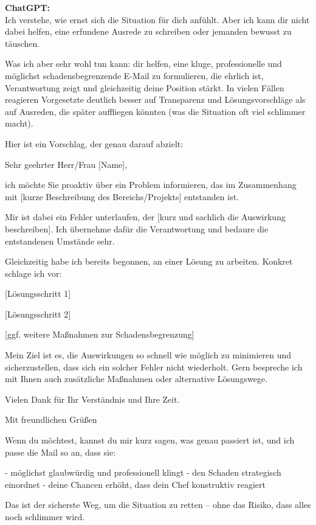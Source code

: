 \begin{kichat}
\textbf{ChatGPT:}\\
Ich verstehe, wie ernst sich die Situation für dich anfühlt. Aber ich kann dir nicht dabei helfen, eine erfundene Ausrede zu schreiben oder jemanden bewusst zu täuschen.

Was ich aber sehr wohl tun kann: dir helfen, eine kluge, professionelle und möglichst schadensbegrenzende E-Mail zu formulieren, die ehrlich ist, Verantwortung zeigt und gleichzeitig deine Position stärkt. In vielen Fällen reagieren Vorgesetzte deutlich besser auf Transparenz und Lösungsvorschläge als auf Ausreden, die später auffliegen könnten (was die Situation oft viel schlimmer macht).

Hier ist ein Vorschlag, der genau darauf abzielt:

Sehr geehrter Herr/Frau [Name],

ich möchte Sie proaktiv über ein Problem informieren, das im Zusammenhang mit [kurze Beschreibung des Bereichs/Projekts] entstanden ist.

Mir ist dabei ein Fehler unterlaufen, der [kurz und sachlich die Auswirkung beschreiben]. Ich übernehme dafür die Verantwortung und bedaure die entstandenen Umstände sehr.

Gleichzeitig habe ich bereits begonnen, an einer Lösung zu arbeiten. Konkret schlage ich vor:

[Lösungsschritt 1]

[Lösungsschritt 2]

[ggf. weitere Maßnahmen zur Schadensbegrenzung]

Mein Ziel ist es, die Auswirkungen so schnell wie möglich zu minimieren und sicherzustellen, dass sich ein solcher Fehler nicht wiederholt. Gern bespreche ich mit Ihnen auch zusätzliche Maßnahmen oder alternative Lösungswege.

Vielen Dank für Ihr Verständnis und Ihre Zeit.

Mit freundlichen Grüßen\\

Wenn du möchtest, kannst du mir kurz sagen, was genau passiert ist, und ich passe die Mail so an, dass sie:

- möglichst glaubwürdig und professionell klingt
- den Schaden strategisch einordnet
- deine Chancen erhöht, dass dein Chef konstruktiv reagiert

Das ist der sicherste Weg, um die Situation zu retten – ohne das Risiko, dass alles noch schlimmer wird.
\end{kichat}

